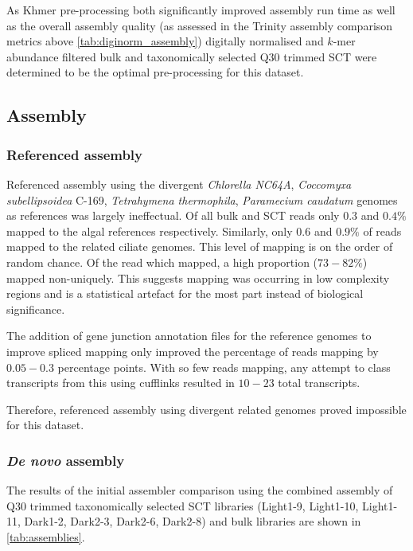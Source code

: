 As Khmer pre-processing both significantly improved assembly run time as well as the overall
assembly quality (as assessed in the Trinity assembly comparison metrics above \cref{tab:diginorm_assembly})
digitally normalised and \(k\)-mer abundance filtered bulk and taxonomically selected Q30
trimmed SCT were determined to be the optimal pre-processing for this dataset. 

\subsection{Assembly}

\subsubsection{Referenced assembly}

Referenced assembly using the divergent \textit{Chlorella NC64A},
\textit{Coccomyxa subellipsoidea} C-169, \textit{Tetrahymena thermophila},
\textit{Paramecium caudatum} genomes as references was largely ineffectual.
Of all bulk and SCT reads only \(0.3\) and \(0.4\%\) mapped to the 
algal references respectively.  Similarly, only \(0.6\) and \(0.9\%\) of reads mapped 
to the related ciliate genomes.   This level of mapping is on the order
of random chance. Of the read which mapped, a high proportion (\(73-82\%\))
mapped non-uniquely. 
This suggests mapping was occurring in low complexity regions and is a statistical
artefact for the most part instead of biological significance.

The addition of gene junction annotation files for the reference genomes to improve
spliced mapping only improved the percentage of reads mapping by \(0.05-0.3\) percentage points.  
With so few reads mapping, any attempt to class transcripts from this using cufflinks 
resulted in \(10-23\) total transcripts.

Therefore, referenced assembly using divergent related genomes proved impossible
for this dataset.

\subsubsection{\textit{De novo} assembly} 

The results of the initial assembler comparison using the combined assembly of 
Q30 trimmed taxonomically selected SCT libraries (Light1-9, Light1-10, Light1-11, 
Dark1-2, Dark2-3, Dark2-6, Dark2-8) and bulk libraries are shown in
\cref{tab:assemblies}. 

